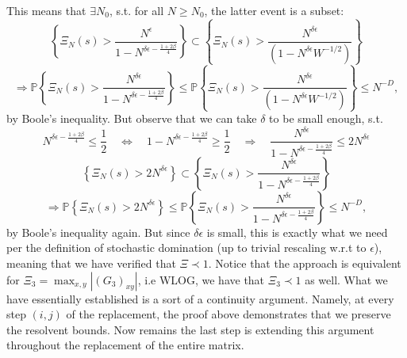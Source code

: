 \documentclass[11pt]{article}
\begin{document}
\noindent This means that $\exists N_0$, s.t. for all $N\geq N_0$, the latter event is a subset: $$ \left\{\Xi_N(s)>\frac{N^\epsilon}{1-N^{{\delta\epsilon}-\frac{1+2\beta}{4}}}\right\}\subset \left\{\Xi_N(s)>\frac{N^{\delta\epsilon}}{(1-N^{\delta\epsilon} W^{-1/2})}\right\}$$
$$\Rightarrow \mathbb{P} \left\{\Xi_N(s)>\frac{N^{\delta\epsilon}}{1-N^{\delta\epsilon-\frac{1+2\beta}{4}}}\right\}\leq\mathbb{P} \left\{\Xi_N(s)>\frac{N^{\delta\epsilon}}{(1-N^{\delta\epsilon} W^{-1/2})}\right\}\leq N^{-D},$$
by Boole's inequality. But observe that we can take $\delta$ to be small enough, s.t. 
$$N^{\delta\epsilon-\frac{1+2\beta}{4}}\leq \frac{1}{2}\quad \Leftrightarrow \quad 1-N^{\delta\epsilon-\frac{1+2\beta}{4}}\geq \frac{1}{2}\quad \Rightarrow \quad \frac{N^{\delta\epsilon}}{1-N^{\delta\epsilon-\frac{1+2\beta}{4}}}\leq 2N^{\delta\epsilon}$$
$$  \left\{\Xi_N(s)> 2N^{\delta\epsilon}\right\}\subset \left\{\Xi_N(s)>\frac{N^{\delta\epsilon}}{1-N^{\delta\epsilon-\frac{1+2\beta}{4}}}\right\}$$
$$\Rightarrow \mathbb{P} \left\{\Xi_N(s)> 2N^{\delta\epsilon}\right\}\leq\mathbb{P} \left\{\Xi_N(s)>\frac{N^{\delta\epsilon}}{1-N^{\delta\epsilon-\frac{1+2\beta}{4}}}\right\}\leq N^{-D},$$
\noindent by Boole's inequality again. But since $\delta\epsilon$ is small, this is exactly what we need per the definition of stochastic domination (up to trivial rescaling w.r.t to $\epsilon$), meaning that we have verified that $\Xi\prec 1$. Notice that the approach is equivalent for $\Xi_3 = \max_{x, y}|(G_3)_{xy}|$, i.e WLOG, we have that $\Xi_3\prec 1$ as well. What we have essentially established is a sort of a continuity argument. Namely, at every step $(i,j)$ of the replacement, the proof above demonstrates that we preserve the resolvent bounds. Now remains the last step is extending this argument throughout the replacement of the entire matrix. 
\end{document}
